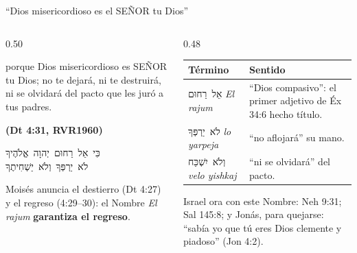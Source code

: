 \documentclass[hyperref={bookmarks=false},aspectratio=169]{beamer}
\newcommand{\heb}[1]{\mbox{\foreignlanguage{hebrew}{#1}}}
\newcommand{\SENOR}{S{\fontsize{0.78em}{1em}\selectfont EÑOR}}
\newcommand{\fuente}[1]{\par\hfill{\upshape\bfseries\footnotesize\textcolor{azul}{#1}}}
\newcommand{\destacar}[1]{\textbf{\textcolor{azul}{#1}}}
\begin{document}
\begin{frame}{``Dios misericordioso es el \SENOR{} tu Dios''}
\begin{columns}[c,onlytextwidth]
\begin{column}{0.50\textwidth}
\begin{cita}porque Dios misericordioso es \SENOR{} tu Dios; no te dejará, ni te destruirá, ni se olvidará del pacto que les juró a tus padres.\fuente{(Dt 4:31, RVR1960)}\end{cita}
\begin{center}\small\heb{כִּי אֵל רַחוּם יְהוָה אֱלֹהֶיךָ}\\ \heb{לֹא יַרְפְּךָ וְלֹא יַשְׁחִיתֶךָ}\end{center}
\small Moisés anuncia el destierro (Dt 4:27) y el regreso (4:29--30): el Nombre \emph{El rajum} \destacar{garantiza el regreso}.
\end{column}
\begin{column}{0.48\textwidth}\scriptsize
\renewcommand{\arraystretch}{1.2}
\begin{tabular}{@{}>{\RaggedRight\arraybackslash}p{1.9cm}>{\RaggedRight\arraybackslash}p{3.8cm}@{}}
\toprule
\textbf{Término} & \textbf{Sentido} \\ \midrule
\heb{אֵל רַחוּם} \emph{El rajum} & ``Dios compasivo'': el primer adjetivo de Éx 34:6 hecho título. \\
\heb{לֹא יַרְפְּךָ} \emph{lo yarpeja} & ``no aflojará'' su mano. \\
\heb{וְלֹא יִשְׁכַּח} \emph{velo yishkaj} & ``ni se olvidará'' del pacto. \\
\bottomrule
\end{tabular}\par\medskip
\small Israel ora con este Nombre: Neh 9:31; Sal 145:8; y Jonás, para quejarse: ``sabía yo que tú eres Dios clemente y piadoso'' (Jon 4:2).
\end{column}
\end{columns}
\end{frame}
\end{document}
